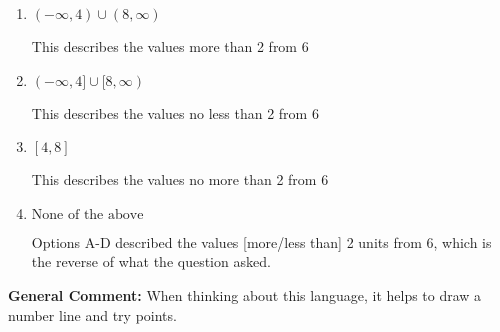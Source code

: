 \documentclass{extbook}[14pt]
\begin{document}
\begin{enumerate}
{\begin{enumerate}[label=\Alph*.]
This describes the values less than 2 from 6
\item \( (-\infty, 4) \cup (8, \infty) \)

This describes the values more than 2 from 6
\item \( (-\infty, 4] \cup [8, \infty) \)

This describes the values no less than 2 from 6
\item \( [4, 8] \)

This describes the values no more than 2 from 6
\item \( \text{None of the above} \)

Options A-D described the values [more/less than] 2 units from 6, which is the reverse of what the question asked.
\end{enumerate}

\textbf{General Comment:} When thinking about this language, it helps to draw a number line and try points.
}
\end{enumerate}
\end{document}
